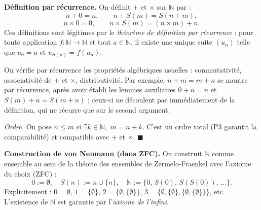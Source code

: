 \decsep{}


\begin{tcolorbox}[thmbox]
  \textbf{Définition par récurrence.}\enspace%
  On définit $+$ et $\times$ sur $\mathbb{N}$ par :
  \[
    n + 0 = n, \qquad n + S(m) = S(n + m),
  \]
  \[
    n \times 0 = 0, \qquad n \times S(m) = (n \times m) + n.
  \]
  Ces définitions sont légitimes par le \emph{théorème de définition par récurrence} :
  pour toute application $f : \mathbb{N} \to \mathbb{N}$ et tout $a \in \mathbb{N}$,
  il existe une unique suite $(u_n)$ telle que $u_0 = a$ et $u_{S(n)} = f(u_n)$.
\end{tcolorbox}

\begin{mdframed}[style=proofbar]
  On vérifie par récurrence les propriétés algébriques usuelles :
  commutativité, associativité de $+$ et $\times$, distributivité.
  Par exemple, $n + m = m + n$ se montre par récurrence, après avoir établi
  les lemmes auxiliaires $0 + n = n$ et $S(m) + n = S(m + n)$ ; ceux-ci ne
  découlent pas immédiatement de la définition, qui ne récurre que sur le
  second argument.

  \textit{Ordre.} On pose $n \leq m$ si $\exists k \in \mathbb{N},\; m = n + k$.
  C'est un ordre total (P3 garantit la comparabilité) et compatible avec $+$ et $\times$.
  $\blacksquare$
\end{mdframed}

\decsep{}


\begin{tcolorbox}[thmbox]
  \textbf{Construction de von Neumann (dans ZFC).}\enspace%
  On construit $\mathbb{N}$ comme ensemble au sein de la théorie des ensembles
  de Zermelo-Fraenkel avec l'axiome du choix (ZFC) :
  \[
    0 := \emptyset, \quad S(n) := n \cup \{n\}, \quad
    \mathbb{N} := \{0,\, S(0),\, S(S(0)),\, \ldots\}.
  \]
  Explicitement : $0=\emptyset$, $1=\{\emptyset\}$, $2=\{\emptyset,\{\emptyset\}\}$,
  $3=\{\emptyset,\{\emptyset\},\{\emptyset,\{\emptyset\}\}\}$, etc.
  L'existence de $\mathbb{N}$ est garantie par l'\emph{axiome de l'infini}.
\end{tcolorbox}


